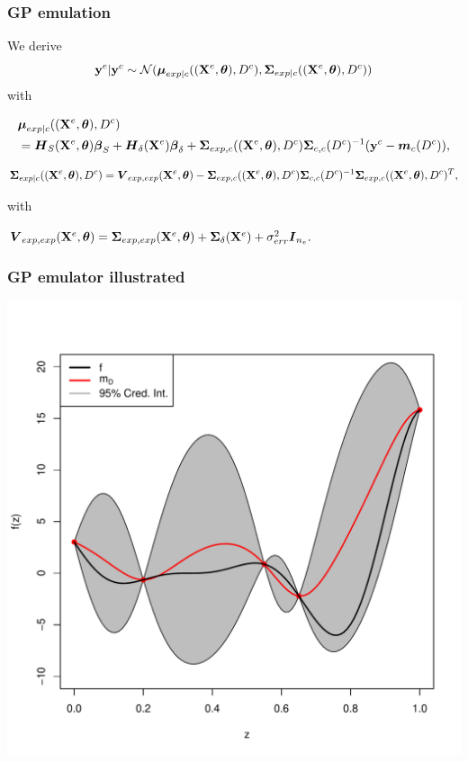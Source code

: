 \documentclass[nopagenumber,9pt]{beamer}
\begin{document}
 \begin{frame}
 \frametitle{GP emulation}
 
 We derive
 \begin{equation*}
\mathbf{y}^{e}|\mathbf{y}^c\sim\mathcal{N}(\boldsymbol{\mu}_{exp|c}((\mathbf{X}^e,\boldsymbol{\theta}),D^c),\boldsymbol{\Sigma}_{exp|c}((\mathbf{X}^e,\boldsymbol{\theta}),D^c))
\end{equation*}
with

\begin{equation*}
\begin{split}
&\boldsymbol{\mu}_{exp|c}((\mathbf{X}^e,\boldsymbol{\theta}),D^c)\\
&= {\boldsymbol{H}_S}(\mathbf{X}^e,\boldsymbol{\theta}) \boldsymbol{\beta}_S + {\boldsymbol{H}_{\delta}}(\mathbf{X}^e)\boldsymbol{\beta}_{\delta}+\boldsymbol{\Sigma}_{exp,c}((\mathbf{X}^e,\boldsymbol{\theta}),D^c)\boldsymbol{\Sigma}_{c,c}(D^c)^{-1}(\mathbf{y}^c-\boldsymbol{m}_c(D^c)),
\label{eq:conditionnalMean}
\end{split}
\end{equation*}

\bigskip
\begin{equation*}
\boldsymbol{\Sigma}_{exp|c}((\mathbf{X}^e,\boldsymbol{\theta}),D^c)=\boldsymbol{V}_{exp,exp}(\mathbf{X}^e,\boldsymbol{\theta})-\boldsymbol{\Sigma}_{exp,c}((\mathbf{X}^e,\boldsymbol{\theta}),D^c)\boldsymbol{\Sigma}_{c,c}(D^c)^{-1}\boldsymbol{\Sigma}_{exp,c}((\mathbf{X}^e,\boldsymbol{\theta}),D^c)^T,
\label{eq:conditionnalVariance}
\end{equation*}
 
 with 
 
 $\boldsymbol{V}_{exp,exp}(\mathbf{X}^e,\boldsymbol{\theta})=\boldsymbol{\Sigma}_{exp,exp}(\mathbf{X}^e,\boldsymbol{\theta})+\boldsymbol{\Sigma}_{\delta}(\mathbf{X}^e) +\sigma_{err}^2\boldsymbol{I}_{n_e}.$
 
\end{frame}


\begin{frame}
 \frametitle{GP emulator illustrated}
 \centering
\includegraphics[scale=.3]{exkriging.pdf}

\end{frame}
\end{document}

